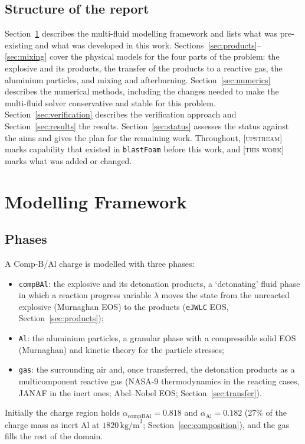 \documentclass{article}
\newcommand{\up}{\textsc{[upstream]}}
\newcommand{\tw}{\textsc{[this work]}}
\begin{document}
\subsection{Structure of the report}

Section~\ref{sec:framework} describes the multi-fluid modelling framework and lists what was pre-existing and what was developed in this work. Sections~\ref{sec:products}--\ref{sec:mixing} cover the physical models for the four parts of the problem: the explosive and its products, the transfer of the products to a reactive gas, the aluminium particles, and mixing and afterburning. Section~\ref{sec:numerics} describes the numerical methods, including the changes needed to make the multi-fluid solver conservative and stable for this problem. Section~\ref{sec:verification} describes the verification approach and Section~\ref{sec:results} the results. Section~\ref{sec:status} assesses the status against the aims and gives the plan for the remaining work. Throughout, \up{} marks capability that existed in \texttt{blastFoam} before this work, and \tw{} marks what was added or changed.

\section{Modelling Framework}
\label{sec:framework}

\subsection{Phases}

A Comp-B/Al charge is modelled with three phases:
\begin{itemize}
    \item \texttt{compBAl}: the explosive and its detonation products, a `detonating' fluid phase in which a reaction progress variable $\lambda$ moves the state from the unreacted explosive (Murnaghan EOS) to the products (\texttt{eJWLC} EOS, Section~\ref{sec:products});
    \item \texttt{Al}: the aluminium particles, a granular phase with a compressible solid EOS (Murnaghan) and kinetic theory for the particle stresses;
    \item \texttt{gas}: the surrounding air and, once transferred, the detonation products as a multicomponent reactive gas (NASA-9 thermodynamics in the reacting cases, JANAF in the inert ones; Abel--Nobel EOS; Section~\ref{sec:transfer}).
\end{itemize}
Initially the charge region holds $\alpha_\text{compBAl} = 0.818$ and $\alpha_\text{Al} = 0.182$ (27\% of the charge mass as inert Al at $1820\,\text{kg/m}^3$; Section~\ref{sec:composition}), and the gas fills the rest of the domain.
\end{document}
